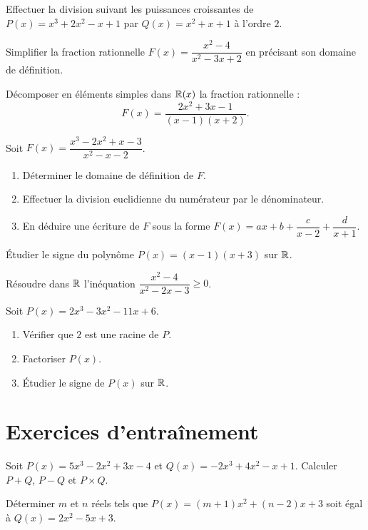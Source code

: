 
\exo{}
Effectuer la division suivant les puissances croissantes de $P(x) = x^3 + 2x^2 - x + 1$ par $Q(x) = x^2 + x + 1$ à l'ordre $2$.


\exo{}
Simplifier la fraction rationnelle $F(x) = \dfrac{x^2 - 4}{x^2 - 3x + 2}$ en précisant son domaine de définition.

\exo{}
Décomposer en éléments simples dans $\mathbb{R}(x)$ la fraction rationnelle :
\[
F(x) = \frac{2x^2 + 3x - 1}{(x-1)(x+2)}.
\]

\exo{}
Soit $F(x) = \dfrac{x^3 - 2x^2 + x - 3}{x^2 - x - 2}$.
\begin{enumerate}[label=\alph*)]
    \item Déterminer le domaine de définition de $F$.
    \item Effectuer la division euclidienne du numérateur par le dénominateur.
    \item En déduire une écriture de $F$ sous la forme $F(x) = ax + b + \dfrac{c}{x-2} + \dfrac{d}{x+1}$.
\end{enumerate}


\exo{}
Étudier le signe du polynôme $P(x) = (x-1)(x+3)$ sur $\mathbb{R}$.

\exo{}
Résoudre dans $\mathbb{R}$ l'inéquation $\dfrac{x^2 - 4}{x^2 - 2x - 3} \geq 0$.

\exo{}
Soit $P(x) = 2x^3 - 3x^2 - 11x + 6$.
\begin{enumerate}[label=\alph*)]
    \item Vérifier que $2$ est une racine de $P$.
    \item Factoriser $P(x)$.
    \item Étudier le signe de $P(x)$ sur $\mathbb{R}$.
\end{enumerate}

\section{Exercices d'entraînement}


\exo{}
Soit $P(x) = 5x^3 - 2x^2 + 3x - 4$ et $Q(x) = -2x^3 + 4x^2 - x + 1$. Calculer $P+Q$, $P-Q$ et $P \times Q$.

\exo{}
Déterminer $m$ et $n$ réels tels que $P(x) = (m+1)x^2 + (n-2)x + 3$ soit égal à $Q(x) = 2x^2 - 5x + 3$.


